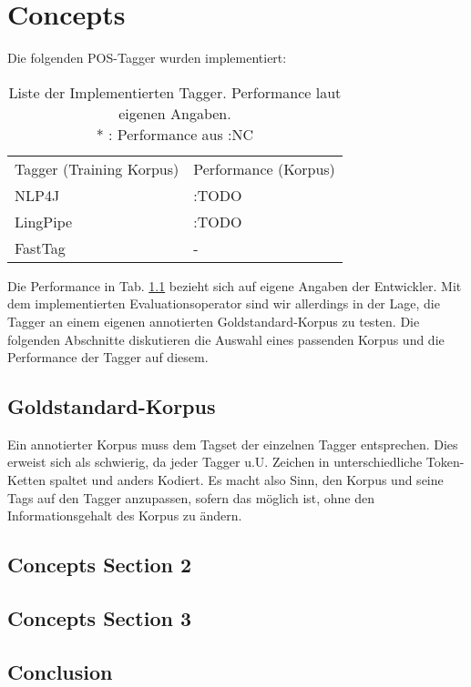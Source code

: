 %
\chapter{Concepts}
\label{sec:eval}

Die folgenden POS-Tagger wurden implementiert:

\begin{table}[htb]
\begin{tabular}{l|l}
Tagger (Training Korpus) & Performance (Korpus)  \\
\cline{1-2}
NLP4J  & :TODO  	\\
LingPipe & :TODO 	\\
FastTag & -           
\end{tabular}
\caption{Liste der Implementierten Tagger. Performance laut eigenen Angaben.\\ \mbox{*} : Performance aus :NC }
\label{sec:eval:list}
\end{table}

Die Performance in Tab. \ref{sec:eval:list} bezieht sich auf eigene Angaben der Entwickler. Mit dem implementierten Evaluationsoperator sind wir allerdings in der Lage, die Tagger an einem eigenen annotierten Goldstandard-Korpus zu testen. Die folgenden Abschnitte diskutieren die Auswahl eines passenden Korpus und die Performance der Tagger auf diesem.

\section{Goldstandard-Korpus}
\label{sec:eval:corpus}

Ein annotierter Korpus muss dem Tagset der einzelnen Tagger entsprechen. Dies erweist sich als schwierig, da jeder Tagger u.U. Zeichen in unterschiedliche Token-Ketten spaltet und anders Kodiert. Es macht also Sinn, den Korpus und seine Tags auf den Tagger anzupassen, sofern das möglich ist, ohne den Informationsgehalt des Korpus zu ändern.



\section{Concepts Section 2}
\label{sec:concepts:sec2}



\section{Concepts Section 3}
\label{sec:concepts:sec3}



\section{Conclusion}
\label{sec:concepts:conclusion}


